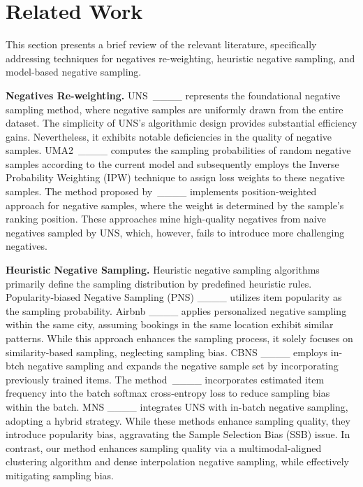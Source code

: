\section{Related Work}
\label{sec:related}
This section presents a brief review of the relevant literature, specifically addressing techniques for negatives re-weighting, heuristic negative sampling, and model-based negative sampling.



\noindent \textbf{Negatives Re-weighting.}
UNS\ ____ represents the foundational negative sampling method, where negative samples are uniformly drawn from the entire dataset. The simplicity of UNS’s algorithmic design provides substantial efficiency gains. Nevertheless, it exhibits notable deficiencies in the quality of negative samples. UMA2\ ____ computes the sampling probabilities of random negative samples according to the current model and subsequently employs the Inverse Probability Weighting (IPW) technique to assign loss weights to these negative samples. The method proposed by\ ____ implements position-weighted approach for negative samples, where the weight is determined by the sample's ranking position. These approaches mine high-quality negatives from naive negatives sampled by UNS, which, however, fails to introduce more challenging negatives.


\noindent \textbf{Heuristic Negative Sampling.}
Heuristic negative sampling algorithms primarily define the sampling distribution by predefined heuristic rules. Popularity-biased Negative Sampling (PNS) ____ utilizes item popularity as the sampling probability. Airbnb ____ applies personalized negative sampling within the same city, assuming bookings in the same location exhibit similar patterns. While this approach enhances the sampling process, it solely focuses on similarity-based sampling, neglecting sampling bias. CBNS ____ employs in-btch negative sampling and expands the negative sample set by incorporating previously trained items. The method\ ____ incorporates estimated item frequency into the batch softmax cross-entropy loss to reduce sampling bias within the batch. MNS ____ integrates UNS with in-batch negative sampling, adopting a hybrid strategy. While these methods enhance sampling quality, they introduce popularity bias, aggravating the Sample Selection Bias (SSB) issue. In contrast, our method enhances sampling quality via a multimodal-aligned clustering algorithm and dense interpolation negative sampling, while effectively mitigating sampling bias.

